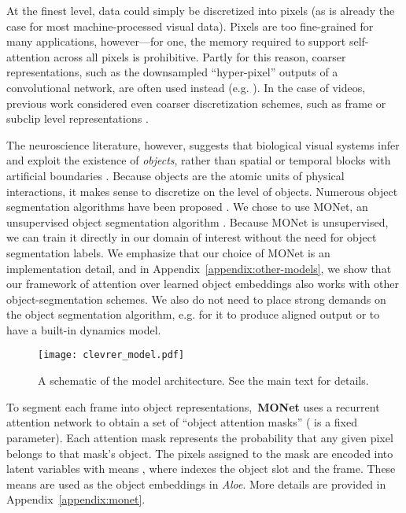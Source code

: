 \documentclass{article}
\newcommand{\Model}{\emph{Aloe}}
\begin{document}
At the finest level, data could simply be discretized into pixels (as is already the case for most machine-processed visual data).
Pixels are too fine-grained for many applications, however---for one, the memory required to support self-attention
across all pixels is prohibitive.
Partly for this reason,
coarser representations, such as the downsampled ``hyper-pixel'' outputs of a convolutional network,
are often used instead  (e.g. \citep{zambaldi2018deep,lu2019vilbert}).
In the case of videos, previous work considered even coarser discretization schemes, such as frame or subclip level representations \citep{sun-videobert}.

The neuroscience literature, however, suggests that biological visual systems infer and exploit the existence of \emph{objects}, rather than  spatial or temporal blocks with artificial boundaries \citep{roelfsema1998, spelke2000, chen2012}.
Because objects are the atomic units of physical interactions,
it makes sense to discretize on the level of objects.
Numerous object segmentation algorithms have been proposed \citep{ren2015faster, he2017maskrcnn, greff2019-iodine}. We chose to use MONet, an unsupervised object segmentation algorithm \citep{monet}. Because MONet is unsupervised, we can train it directly in our domain of interest without the need for object segmentation labels. We emphasize that our choice of MONet is an implementation
detail, and in Appendix~\ref{appendix:other-models}, we show that our framework of attention over learned object embeddings also works with other object-segmentation schemes.
We also do not need to place strong demands on the object segmentation algorithm,
e.g. for it to produce aligned output or to have a built-in dynamics model.

\begin{figure*}[t]
    \centering
    \texttt{[image: clevrer\_model.pdf]}
    \caption{\label{figure:architecture} A schematic of the model architecture. See the main text for details.}
\end{figure*}


To segment each frame into object representations,~\textbf{MONet}  uses a recurrent attention network to obtain a set of  ``object attention masks'' ( is a fixed parameter). Each attention mask represents the probability that any given pixel belongs to that mask's object.
The pixels assigned to the mask are encoded into latent variables with means 
, where  indexes the object slot and  the frame.
These means are used as the object embeddings in \Model{}.
More details are provided in Appendix~\ref{appendix:monet}.
\end{document}
